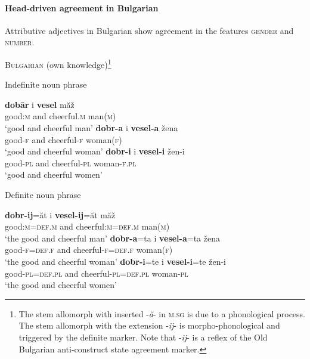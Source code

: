 \paragraph{Head-driven agreement in Bulgarian}
Attributive adjectives in Bulgarian show agreement in the features \textsc{gender} and \textsc{number}.
\begin{exe}
\ex \textsc{Bulgarian} (own knowledge)\footnote{The stem allomorph with inserted -\textit{ă}- in \textsc{m.sg} is due to a phonological process. The stem allomorph with the extension -\textit{ij}- is morpho-phonological and triggered by the definite marker. Note that -\textit{ij}- is a reflex of the Old Bulgarian anti-construct state agreement marker.}
\begin{xlist}
\ex 	Indefinite noun phrase
\begin{xlist}
\ex
\gll	\textbf{dobăr} i \textbf{vesel} măž\\
	good:\textsc{m} and cheerful.\textsc{m} man(\textsc{m})\\
\glt	‘good and cheerful man’
\ex
\gll	\textbf{dobr-a} i \textbf{vesel-a} žena\\
	good-\textsc{f} and cheerful-\textsc{f} woman(\textsc{f})\\
\glt	‘good and cheerful woman’
\ex
\gll	\textbf{dobr-i} i \textbf{vesel-i} žen-i\\
	good-\textsc{pl} and cheerful-\textsc{pl} woman-\textsc{f.pl}\\
\glt	‘good and cheerful women’
\end{xlist}
\ex	Definite noun phrase
\begin{xlist}
\ex
\gll	\textbf{dobr-ij}=ăt i \textbf{vesel-ij}=ăt măž\\
	good:\textsc{m}=\textsc{def.m} and cheerful:\textsc{m}=\textsc{def.m} man(\textsc{m})\\
\glt	‘the good and cheerful man’
\ex
\gll	\textbf{dobr-a}=ta i \textbf{vesel-a}=ta žena\\
	good-\textsc{f}=\textsc{def.f} and cheerful-\textsc{f}=\textsc{def.f} woman(\textsc{f})\\
\glt	‘the good and cheerful woman’
\ex
\gll	\textbf{dobr-i}=te i \textbf{vesel-i}=te žen-i\\
	good-\textsc{pl}=\textsc{def.pl} and cheerful-\textsc{pl}=\textsc{def.pl} woman-\textsc{pl}\\
\glt	‘the good and cheerful women’
\end{xlist}
\end{xlist}
\end{exe}


